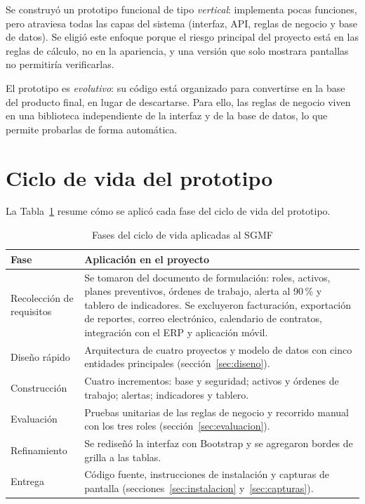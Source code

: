 \documentclass[12pt,letterpaper]{article}
\begin{document}
Se construyó un prototipo funcional de tipo \emph{vertical}: implementa pocas funciones, pero atraviesa todas las capas del sistema (interfaz, API, reglas de negocio y base de datos). Se eligió este enfoque porque el riesgo principal del proyecto está en las reglas de cálculo, no en la apariencia, y una versión que solo mostrara pantallas no permitiría verificarlas.

El prototipo es \emph{evolutivo}: su código está organizado para convertirse en la base del producto final, en lugar de descartarse. Para ello, las reglas de negocio viven en una biblioteca independiente de la interfaz y de la base de datos, lo que permite probarlas de forma automática.

\section{Ciclo de vida del prototipo}

La Tabla~\ref{tab:ciclo} resume cómo se aplicó cada fase del ciclo de vida del prototipo.

\begin{table}[H]
  \centering
  \caption{Fases del ciclo de vida aplicadas al SGMF}\label{tab:ciclo}
  \begin{tabularx}{\textwidth}{@{}lX@{}}
    \toprule
    Fase & Aplicación en el proyecto \\
    \midrule
    Recolección de requisitos & Se tomaron del documento de formulación: roles, activos, planes preventivos, órdenes de trabajo, alerta al 90\,\% y tablero de indicadores. Se excluyeron facturación, exportación de reportes, correo electrónico, calendario de contratos, integración con el ERP y aplicación móvil. \\
    Diseño rápido & Arquitectura de cuatro proyectos y modelo de datos con cinco entidades principales (sección~\ref{sec:diseno}). \\
    Construcción & Cuatro incrementos: base y seguridad; activos y órdenes de trabajo; alertas; indicadores y tablero. \\
    Evaluación & Pruebas unitarias de las reglas de negocio y recorrido manual con los tres roles (sección~\ref{sec:evaluacion}). \\
    Refinamiento & Se rediseñó la interfaz con Bootstrap y se agregaron bordes de grilla a las tablas. \\
    Entrega & Código fuente, instrucciones de instalación y capturas de pantalla (secciones~\ref{sec:instalacion} y~\ref{sec:capturas}). \\
    \bottomrule
  \end{tabularx}
\end{table}
\end{document}
